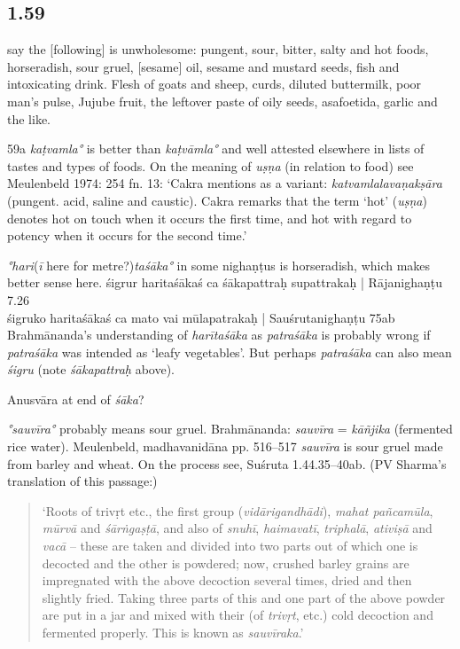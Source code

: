 \begin{ekdosis}
\subsection*{1.59}
\begin{translation}[hp01_059]
[Adepts] say the [following] is unwholesome: pungent, sour, bitter, salty and hot foods, horseradish, sour gruel, [sesame] oil, sesame and mustard seeds, fish and intoxicating drink. Flesh of goats and sheep, curds, diluted buttermilk, poor man's pulse, Jujube fruit, the leftover paste of oily seeds, asafoetida, garlic and the like. 
\end{translation}

\begin{philcomm}[hp01_059]
59a \emph{kaṭvamla°} is better than \emph{kaṭvāmla°} and well attested elsewhere in lists of tastes and types of foods.
On the meaning of \emph{uṣṇa} (in relation to food) see Meulenbeld 1974: 254 fn. 13: ‘Cakra mentions as a variant: \emph{katvamlalavaṇakṣāra} (pungent. acid, saline and caustic). Cakra remarks that the term `hot' (\emph{uṣṇa}) denotes hot on touch when it occurs the first time, and hot with regard to potency when it occurs for the second time.’

\emph{°hari}(\emph{ī} here for metre?)\emph{taśāka°} in some nighaṇṭus is horseradish, which makes better sense here.
\startverse
śigrur haritaśākaś ca śākapattraḥ supattrakaḥ | \textup{Rājanighaṇṭu 7.26}\\
śigruko haritaśākaś ca mato vai mūlapatrakaḥ | \textup{Sauśrutanighaṇṭu 75ab}\\
\endverse
Brahmānanda’s understanding of \emph{harītaśāka} as \emph{patraśāka} is probably wrong if \emph{patraśāka} was intended as ‘leafy vegetables’. But perhaps \emph{patraśāka} can also mean \emph{śigru} (note \emph{śākapattraḥ} above).

Anusvāra at end of \emph{śāka}?

\emph{°sauvīra°} probably means sour gruel.
Brahmānanda: \emph{sauvīra} = \emph{kāñjika} (fermented rice water).
Meulenbeld, madhavanidāna pp. 516–517
\emph{sauvīra} is sour gruel made from barley and wheat. On the process see, Suśruta 1.44.35--40ab.
(PV Sharma’s translation of this passage:)

\begin{quote}
‘Roots of trivṛt etc., the first group (\emph{vidārigandhādi}), \emph{mahat pañcamūla}, \emph{mūrvā} and \emph{śārṅgaṣṭā}, and also of \emph{snuhī}, \emph{haimavatī}, \emph{triphalā}, \emph{ativiṣā} and \emph{vacā} -- these are taken and divided into two parts out of which one is decocted and the other is powdered; now, crushed barley grains are impregnated with the above decoction several times, dried and then slightly fried. Taking three parts of this and one part of the above powder are put in a jar and mixed with their (of \emph{trivṛt}, etc.) cold decoction and fermented properly. This is known as \emph{sauvīraka}.’
\end{quote}


\end{philcomm}
\end{ekdosis}

